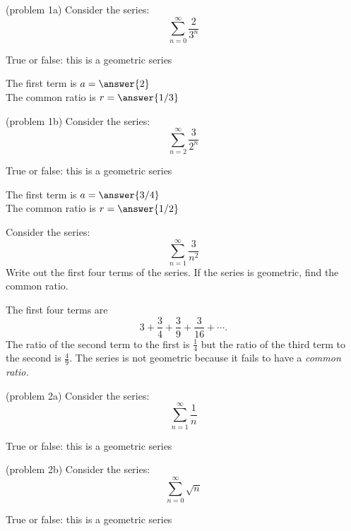 \documentclass[handout]{ximera}
\begin{document}
 

\begin{problem}(problem 1a)
 Consider the series:
 \[
 \sum_{n=0}^\infty \frac{2}{3^n} 
 \]
 
 True or false: this is a geometric series 
 
 The first term is $a = \answer{2}$\\
 The common ratio is $r = \answer{1/3}$
 \end{problem}
 
 
 \begin{problem}(problem 1b)
 Consider the series:
 \[
 \sum_{n=2}^\infty \frac{3}{2^n} 
 \]
 
 True or false: this is a geometric series 
 
 The first term is $a = \answer{3/4}$\\
 The common ratio is $r = \answer{1/2}$
 \end{problem}
 
 
 \begin{example}[example 2]
 Consider the series:
\[
 \sum_{n=1}^\infty \frac{3}{n^2} 
 \]
 Write out the first four terms of the series. If the series is geometric, find the common ratio.
 
 The first four terms are 
 \[
 3 + \frac34 + \frac39 + \frac{3}{16} + \cdots.
 \]
 The ratio of the second term to the first is $\frac14$ but the ratio of the third term to the second is $\frac49$.
 The series is not geometric because it fails to have a \it{common} ratio.
 
 \end{example}
 

 
\begin{problem}(problem 2a)
 Consider the series:
 \[
 \sum_{n=1}^\infty \frac{1}{n} 
 \]
 
 True or false: this is a geometric series 
 
 \end{problem}
 

   \begin{problem}(problem 2b)
 Consider the series:
 \[
 \sum_{n=0}^\infty \sqrt n 
 \]

True or false: this is a geometric series 
 
 \end{problem}
 
\end{document}
